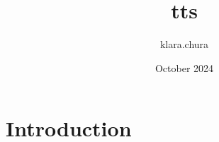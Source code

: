\documentclass{article}
\title{tts}
\author{klara.chura }
\date{October 2024}
\begin{document}
\maketitle

\section{Introduction}
\end{document}
